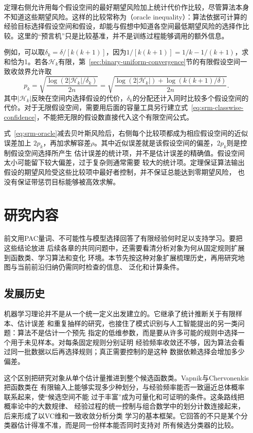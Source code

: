 定理右侧允许用每个假设空间的最好期望风险加上统计代价作比较，尽管算法本身不知道这些期望风险。这样的比较常称为（oracle inequality）：算法依据可计算的经验目标选择假设空间和假设，却能与假想中知道各空间最低期望风险的选择作比较。这里的“预言机”只是比较基准，并不是训练过程能够调用的额外信息。

例如，可以取$\delta_k=\delta/[k(k+1)]$，因为$1/[k(k+1)]=1/k-1/(k+1)$，求和恰为1。若各$\mathcal H_k$有限，第~\ref{sec:binary-uniform-convergence}节的有限假设空间一致收敛界允许取
\[
 p_k=\sqrt{\frac{\log(2|\mathcal H_k|/\delta_k)}{2n}}
 =\sqrt{\frac{\log(2|\mathcal H_k|)+\log(k(k+1)/\delta)}{2n}}.
\]
其中$|\mathcal H_k|$反映在空间内选择假设的代价，$\delta_k$的分配还计入同时比较多个假设空间的代价。对于无限假设空间，需要用后面的容量工具另行建立式~\eqref{eq:srm-classwise-confidence}，不能把无限的假设数直接代入这个有限空间公式。

式~\eqref{eq:srm-oracle}减去贝叶斯风险后，右侧每个比较项都成为相应假设空间的近似误差加上
$2p_k$，再加求解容差$\rho$。其中近似误差就是该假设空间的偏差，$2p_k$则是控制假设空间选择所产生
估计误差的统计项，并不是估计误差的精确值。假设空间太小可能留下较大偏差，过于复杂则通常需要
较大的统计项。定理保证算法输出假设的期望风险受这些比较项中最好者控制，并不保证总能达到零期望风险，
也没有保证带惩罚目标能够被高效求解。

\section{研究内容}
\label{sec:learning-theory-research-content}

前文用PAC量词、不可能性与模型选择回答了有限经验何时足以支持学习。要把这些结论放进
后续各章的共同问题中，还需要看清分析对象为何从固定规则扩展到函数类、学习算法和变化
环境。本节先按这种对象扩展梳理历史，再用研究地图与当前前沿归纳仍需同时检查的信息、
泛化和计算条件。

\subsection{发展历史}

机器学习理论并不是从一个统一定义出发建立的。它继承了统计推断关于有限样本、估计误差
和重复抽样的研究，也接住了模式识别与人工智能提出的另一类问题：算法不是估计一个预先
指定的低维参数，而是要从许多可能的规则中选择一个用于未见样本。对每条固定规则分别证明
经验频率收敛还不够，因为算法会看过同一批数据以后再选择规则；真正需要控制的是这种
数据依赖选择会增加多少偏差。

这个区别把研究对象从单个估计量推进到整个候选函数类。Vapnik与Chervonenkis把函数类在
有限输入上能够实现多少种划分，与经验频率能否一致逼近总体概率联系起来，使“候选空间不能
过于丰富”成为可量化和可证明的条件。这条路线把概率论中的大数规律、
经验过程的统一控制与组合数学中的划分计数连接起来，后来形成了以VC维和一致收敛分析分类
学习的基本框架。它回答的不只是某个分类器估计得准不准，而是同一份样本能否同时支持对
所有候选分类器的比较。

